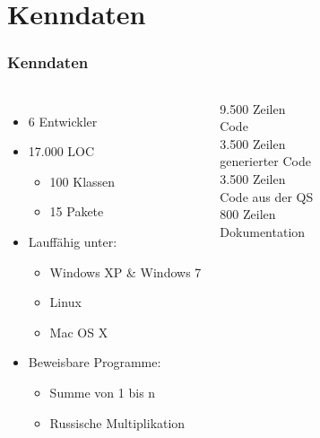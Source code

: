 \documentclass{beamer}
\begin{document}
\section{Kenndaten}
\begin{frame}
\frametitle{Kenndaten}
\begin{columns}[c]
\column{190pt}
\begin{itemize}
\item 6 Entwickler
\item 17.000 LOC
\begin{itemize}
\item 100 Klassen
\item 15 Pakete
\end{itemize}
\item Lauffähig unter:
\begin{itemize}
\item Windows XP \& Windows 7
\item Linux
\item Mac OS X
\end{itemize}
\item Beweisbare Programme:
\begin{itemize}
\item Summe von 1 bis n
\item Russische Multiplikation
\end{itemize}
\end{itemize}

\column{115pt}
9.500 Zeilen\\
Code\\
\vspace{1\baselineskip}
3.500 Zeilen\\
generierter Code\\
\vspace{1\baselineskip}
3.500 Zeilen\\
Code aus der QS\\
\vspace{1\baselineskip}
800 Zeilen\\
Dokumentation
\end{columns}
\end{frame}
\end{document}
